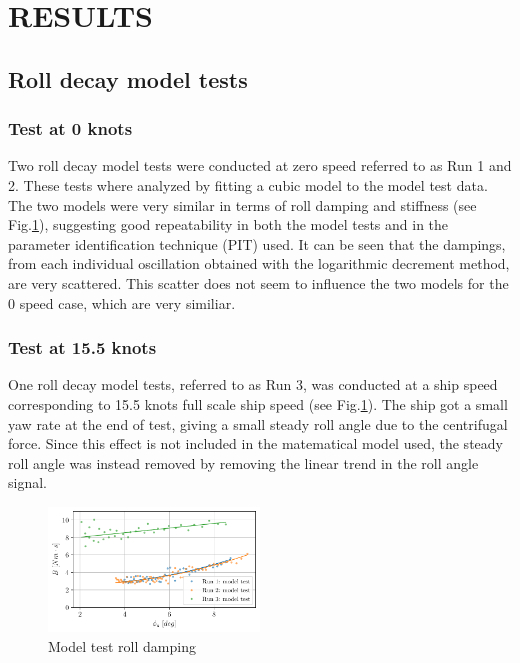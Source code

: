 \section*{RESULTS}\label{results}

    \subsection*{Roll decay model tests}\label{roll-decay-model-tests}

\subsubsection*{Test at 0 knots}\label{test-at-0-knots}

Two roll decay model tests were conducted at zero speed referred to as
Run 1 and 2.
These tests where analyzed by fitting a cubic model
to the model test data. The two models were very similar in terms of
roll damping and stiffness (see Fig.\ref{fig:mdl}), suggesting
good repeatability in both the model tests and in the parameter
identification technique (PIT) used. It can be seen that the dampings,
from each individual oscillation obtained with the logarithmic decrement
method, are very scattered. This scatter does not seem to influence the
two models for the 0 speed case, which are very similiar.

    \subsubsection*{Test at 15.5 knots}\label{test-at-15.5-knots}

One roll decay model tests, referred to as Run 3, was conducted at a
ship speed corresponding to 15.5 knots full scale ship speed (see
Fig.\ref{fig:mdl}). The ship got a small yaw rate
 at the end of test, giving a small steady roll angle due to the
centrifugal force. Since this effect is not included in the matematical
model used, the steady roll angle was instead removed by removing the
linear trend in the roll angle signal.

    

    \begin{figure}[H]
        \begin{center}\includegraphics[width = 0.5\textwidth]{figures/mdl.pdf}\end{center}
        \vspace{-1cm}
        \caption{Model test roll damping}
        \label{fig:mdl}
    \end{figure}
    

